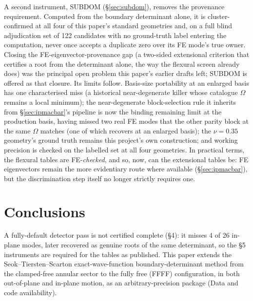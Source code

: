 \documentclass[11pt]{article}
\begin{document}
A second instrument, SUBDOM (\S\ref{sec:subdom}), removes the provenance
requirement. Computed from the boundary
determinant alone, it is cluster-confirmed at all four of
this paper's standard geometries and, on a full blind adjudication set of
122 candidates with no ground-truth label entering the computation, never
once accepts a duplicate zero over its FE mode's true owner. Closing the
FE-eigenvector-provenance gap (a two-sided extensional criterion that
certifies a root from the determinant alone, the way the flexural screen
already does) was the principal open problem this paper's earlier drafts
left; SUBDOM is offered as that closure. Its limits follow. Basis-size portability
at an enlarged basis has one characterised miss (a historical
near-degenerate killer whose catalogue $\Omega$ remains a local minimum);
the near-degenerate
block-selection rule it inherits from \S\ref{sec:ipmacbar}'s pipeline is
now the binding remaining limit at the production basis, having missed
two real FE modes that the other parity block at the same $\Omega$
matches (one of which recovers at an enlarged basis); the $\nu=0.35$
geometry's ground truth remains this project's own construction; and
working precision is checked on the labelled set at all four geometries.
In practical terms, the flexural tables are FE-\emph{checked}, and so, now,
can the extensional tables be: FE eigenvectors remain the more evidentiary
route where available (\S\ref{sec:ipmacbar}), but the discrimination step
itself no longer strictly requires one.

\section{Conclusions}
A fully-default detector pass is not certified complete (\S4): it misses
4 of 26 in-plane modes, later recovered as genuine roots of the same
determinant, so the \S5 instruments are required for the tables as
published. This paper extends the Seok--Tiersten--Scarton
exact-wave-function boundary-determinant method from the clamped-free
annular sector to the fully free (FFFF) configuration, in both
out-of-plane and in-plane motion, as an arbitrary-precision package
(Data and code availability).
\end{document}

